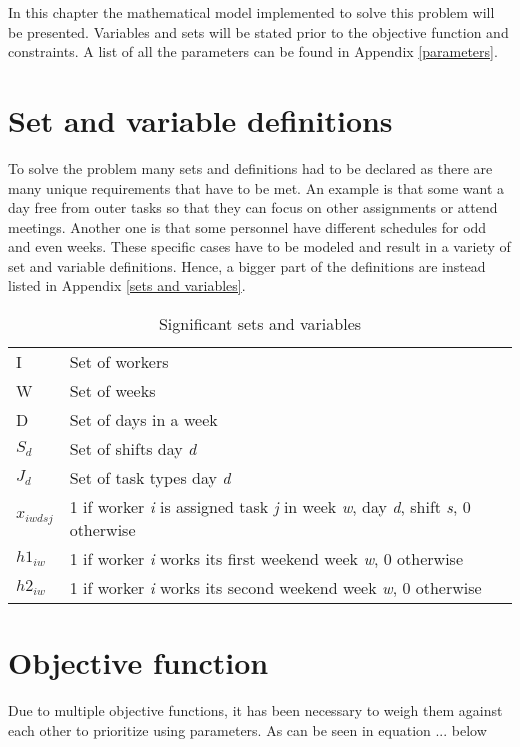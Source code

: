 In this chapter the mathematical model implemented to solve this problem will be presented. Variables and sets will be stated prior to the objective function and constraints. A list of all the parameters can be found in Appendix \ref{parameters}. 
\section{Set and variable definitions} \label{variables}
To solve the problem many sets and definitions had to be declared as there are many unique requirements that have to be met. An example is that some want a day free from outer tasks so that they can focus on other assignments or attend meetings. Another one is that some personnel have different schedules for odd and even weeks. These specific cases have to be modeled and result in a variety of set and variable definitions. Hence, a bigger part of the definitions are instead listed in Appendix \ref{sets and variables}.
\begin{table}[H]
\centering
\caption{Significant sets and variables}
\label{tab:sets and variables}
\begin{tabular}{ll}
I                & Set of workers                                             \\
W                & Set of weeks                                               \\
D                & Set of days in a week                                      \\
$S_d$           & Set of shifts day \textit{d}                                        \\
$J_d$           & Set of task types day \textit{d}                                    \\
$x_{iwdsj}$ & 1 if worker \textit{i} is assigned task \textit{j} in week \textit{w}, day \textit{d}, shift \textit{s}, 0 otherwise \\
$h1_{iw}$      & 1 if worker \textit{i} works its first weekend week \textit{w}, 0 otherwise               \\
$h2_{iw}$      & 1 if worker \textit{i} works its second weekend week \textit{w}, 0 otherwise             
\end{tabular}
\end{table}



\section{Objective function}
Due to multiple objective functions, it has been necessary to weigh them against each other to prioritize using parameters. As can be seen in equation ... below

